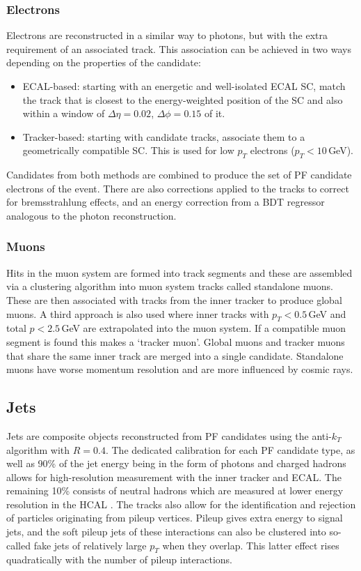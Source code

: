 \subsubsection{Electrons}
Electrons are reconstructed in a similar way to photons, but with the extra requirement of an associated track. This association can be achieved in two ways depending on the properties of the candidate:
\begin{itemize}
    \item ECAL-based: starting with an energetic and well-isolated ECAL SC, match the track that is closest to the energy-weighted position of the SC and also within a window of $\Delta\eta=0.02$, $\Delta\phi=0.15$ of it.
    \item Tracker-based: starting with candidate tracks, associate them to a geometrically compatible SC. This is used for low $p_{T}$ electrons ($p_{T} < 10$\,GeV).
\end{itemize}
Candidates from both methods are combined to produce the set of PF candidate electrons of the event. 
There are also corrections applied to the tracks to correct for bremsstrahlung effects, and an energy correction from a BDT regressor analogous to the photon reconstruction. 

\subsubsection{Muons}
Hits in the muon system are formed into track segments and these are assembled via a clustering algorithm into muon system tracks called standalone muons. 
These are then associated with tracks from the inner tracker to produce global muons. A third approach is also used where inner tracks with $p_{T}<0.5$\,GeV and total $p < 2.5$\,GeV are extrapolated into the muon system. If a compatible muon segment is found this makes a `tracker muon'. Global muons and tracker muons that share the same inner track are merged into a single candidate. 
Standalone muons have worse momentum resolution and are more influenced by cosmic rays.

\subsection{Jets}
Jets are composite objects reconstructed from PF candidates using the anti-$k_T$ algorithm \cite{AntiKt} with $R=0.4$. 
The dedicated calibration for each PF candidate type, as well as 90\% of the jet energy being in the form of photons and charged hadrons allows for high-resolution measurement with the inner tracker and ECAL. The remaining 10\% consists of neutral hadrons which are measured at lower energy resolution in the HCAL \cite{JetPerformance}. 
The tracks also allow for the identification and rejection of particles originating from pileup vertices. Pileup gives extra energy to signal jets, and the soft pileup jets of these interactions can also be clustered into so-called fake jets of relatively large $p_{T}$ when they overlap. This latter effect rises quadratically with the number of pileup interactions. 


